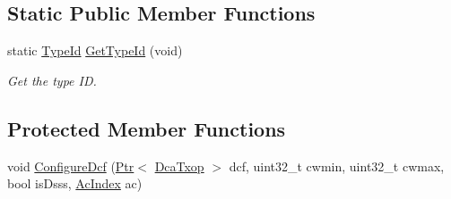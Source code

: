\subsection*{Static Public Member Functions}
\begin{DoxyCompactItemize}
\item 
static \hyperlink{classns3_1_1TypeId}{Type\+Id} \hyperlink{classns3_1_1WifiMac_a818f25109b406fede9339747eda0d84d}{Get\+Type\+Id} (void)
\begin{DoxyCompactList}\small\item\em Get the type ID. \end{DoxyCompactList}\end{DoxyCompactItemize}
\subsection*{Protected Member Functions}
\begin{DoxyCompactItemize}
\item 
void \hyperlink{classns3_1_1WifiMac_aa9f8bc40a789b802b25df6ef08040a54}{Configure\+Dcf} (\hyperlink{classns3_1_1Ptr}{Ptr}$<$ \hyperlink{classns3_1_1DcaTxop}{Dca\+Txop} $>$ dcf, uint32\+\_\+t cwmin, uint32\+\_\+t cwmax, bool is\+Dsss, \hyperlink{group__wifi_gab422b4562ba272b39a9b6bca3513f3ac}{Ac\+Index} ac)
\end{DoxyCompactItemize}
